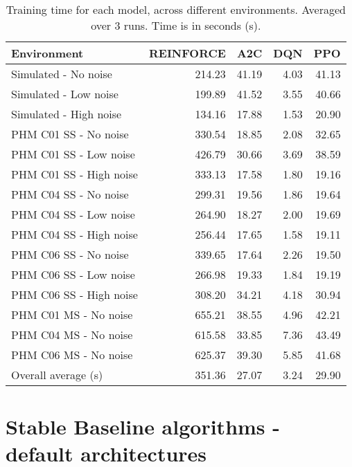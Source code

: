 \documentclass[]{article}
\newcommand{\rowspace}[1]{\renewcommand{\arraystretch}{#1}}
\begin{document}
\begin{table*}[hbt!]\centering
	\sffamily
	\rowspace{1.3}
	\begin{tabular}{@{}l r r r r@{}}
		\arrayrulecolor{black!40}\toprule
		\textbf{Environment} &\textbf{REINFORCE} &\textbf{A2C}&\textbf{DQN}&\textbf{PPO}\\ \midrule
		Simulated  - No noise &214.23 &41.19&4.03&41.13\\
		Simulated  - Low noise &199.89 &41.52&3.55&40.66\\
		Simulated  - High noise &134.16 &17.88&1.53&20.90\\ \midrule
		
		PHM C01 SS - No noise &330.54 &18.85&2.08&32.65\\
		PHM C01 SS - Low noise &426.79 &30.66&3.69&38.59\\
		PHM C01 SS - High noise &333.13 &17.58&1.80&19.16\\ \midrule
		
		PHM C04 SS - No noise &299.31 &19.56&1.86&19.64\\
		PHM C04 SS - Low noise &264.90 &18.27&2.00&19.69\\
		PHM C04 SS - High noise &256.44 &17.65&1.58&19.11\\ \hdashline
		
		PHM C06 SS - No noise &339.65 &17.64&2.26&19.50\\
		PHM C06 SS - Low noise &266.98 &19.33&1.84&19.19\\
		PHM C06 SS - High noise &308.20 &34.21&4.18&30.94\\ \hdashline
		
		PHM C01 MS - No noise &655.21 &38.55&4.96&42.21\\
		PHM C04 MS - No noise &615.58 &33.85&7.36&43.49\\
		PHM C06 MS - No noise &625.37 &39.30&5.85&41.68\\  \midrule
		
		Overall average (s) &351.36 &27.07&3.24&29.90\\
		\bottomrule
\end{tabular}
\caption{Training time for each model, across different environments. Averaged over 3 runs. Time is in seconds (s).}
\label{tbl:TrainingTimes}
\end{table*}



\section{Stable Baseline algorithms - default architectures}
\end{document}
